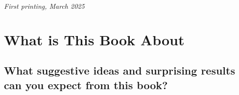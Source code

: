 \documentclass[
	11pt, %
	fleqn, %
	a4paper, %
]{LegrandOrangeBook}
\begin{document}
\noindent \textit{First printing, March 2025} %


\pagestyle{empty} %

\tableofcontents %

\listoffigures %

\listoftables %

\pagestyle{fancy} %

\cleardoublepage %


\part{What is This Book About}


\chapterspaceabove{6.75cm} %
\chapterspacebelow{7.25cm} %

\chapter[What can you expect from this book?]{What suggestive ideas and surprising results can you expect from this book?}
\label{ch:whatthisbook}
\end{document}

